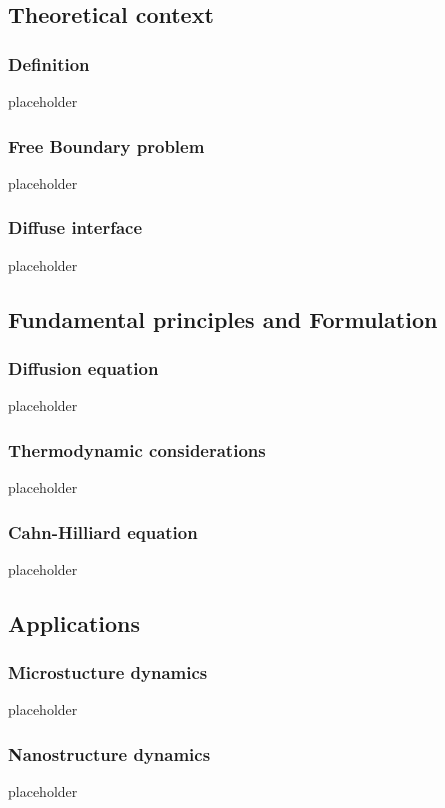 \subsection{Theoretical context}
    \subsubsection{Definition}
        placeholder
    \subsubsection{Free Boundary problem}
        placeholder
    \subsubsection{Diffuse interface}
        placeholder
\subsection{Fundamental principles and Formulation}
    \subsubsection{Diffusion equation}
        placeholder
    \subsubsection{Thermodynamic considerations}
        placeholder
    \subsubsection{Cahn-Hilliard equation}
        placeholder
\subsection{Applications}
    \subsubsection{Microstucture dynamics}
        placeholder
    \subsubsection{Nanostructure dynamics}
        placeholder